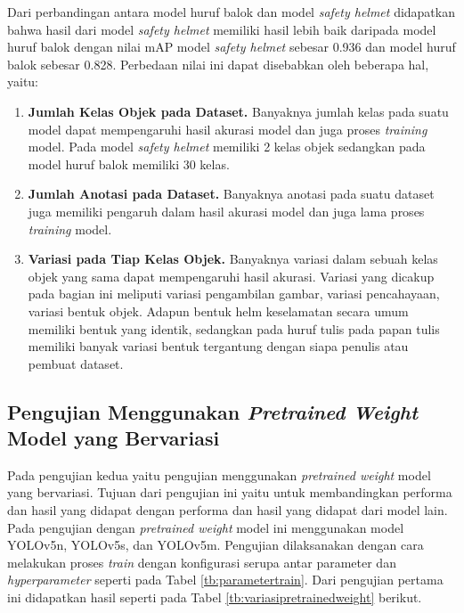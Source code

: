 Dari perbandingan antara model huruf balok dan model \textit{safety helmet} didapatkan bahwa hasil dari model \textit{safety helmet} memiliki hasil lebih baik daripada model huruf balok dengan nilai mAP model \textit{safety helmet} sebesar 0.936 dan model huruf balok sebesar 0.828. Perbedaan nilai ini dapat disebabkan oleh beberapa hal, yaitu:
\begin{enumerate}[nolistsep]
  \item \textbf{Jumlah Kelas Objek pada Dataset.} Banyaknya jumlah kelas pada suatu model dapat mempengaruhi hasil akurasi model dan juga proses \textit{training} model. Pada model \textit{safety helmet} memiliki 2 kelas objek sedangkan pada model huruf balok memiliki 30 kelas.
  \item \textbf{Jumlah Anotasi pada Dataset.} Banyaknya anotasi pada suatu dataset juga memiliki pengaruh dalam hasil akurasi model dan juga lama proses \textit{training} model.
  \item \textbf{Variasi pada Tiap Kelas Objek.} Banyaknya variasi dalam sebuah kelas objek yang sama dapat mempengaruhi hasil akurasi. Variasi yang dicakup pada bagian ini meliputi variasi pengambilan gambar, variasi pencahayaan, variasi bentuk objek. 
  Adapun bentuk helm keselamatan secara umum memiliki bentuk yang identik, sedangkan pada huruf tulis pada papan tulis memiliki banyak variasi bentuk tergantung dengan siapa penulis atau pembuat dataset.
\end{enumerate}

\subsection{Pengujian Menggunakan \textit{Pretrained Weight} Model yang Bervariasi}
\label{subsec:pengujianpretrainedweight}

Pada pengujian kedua yaitu pengujian menggunakan \textit{pretrained weight} model yang bervariasi. Tujuan dari pengujian ini yaitu untuk membandingkan performa dan hasil yang didapat dengan performa dan hasil yang didapat dari model lain. Pada pengujian dengan \textit{pretrained weight} model ini menggunakan model YOLOv5n, YOLOv5s, dan YOLOv5m. Pengujian dilaksanakan dengan cara melakukan proses \textit{train} dengan konfigurasi serupa antar parameter dan \textit{hyperparameter} seperti pada Tabel \ref*{tb:parametertrain}. Dari pengujian pertama ini didapatkan hasil seperti pada Tabel \ref*{tb:variasipretrainedweight} berikut. \par

